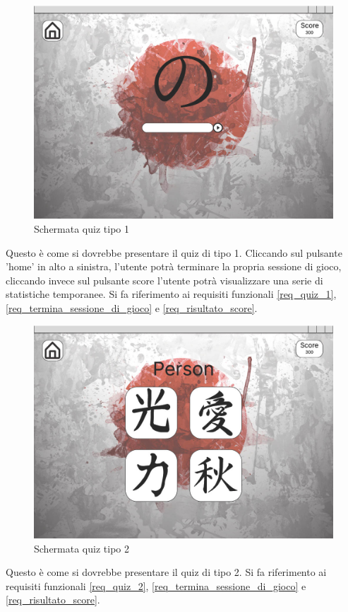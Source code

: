 \begin{figure}[!h]
\centering
\includegraphics[scale=0.35]{images/quiz_1.jpg}
\caption{Schermata quiz tipo 1}
\label{fig:schermata_quiz_1}
\end{figure}
\noindent
Questo è come si dovrebbe presentare il quiz di tipo 1. Cliccando sul pulsante 'home' in alto a sinistra, l'utente potrà terminare la propria sessione di gioco, cliccando invece sul pulsante score l'utente potrà visualizzare una serie di statistiche temporanee. Si fa riferimento ai requisiti funzionali \ref{req_quiz_1}, \ref{req_termina_sessione_di_gioco} e \ref{req_risultato_score}.
\newpage

\begin{figure}[!h]
\centering
\includegraphics[scale=0.35]{images/quiz_2.jpg}
\caption{Schermata quiz tipo 2}
\label{fig:schermata_quiz_2}
\end{figure}
\noindent
Questo è come si dovrebbe presentare il quiz di tipo 2. Si fa riferimento ai requisiti funzionali \ref{req_quiz_2}, \ref{req_termina_sessione_di_gioco} e \ref{req_risultato_score}.

